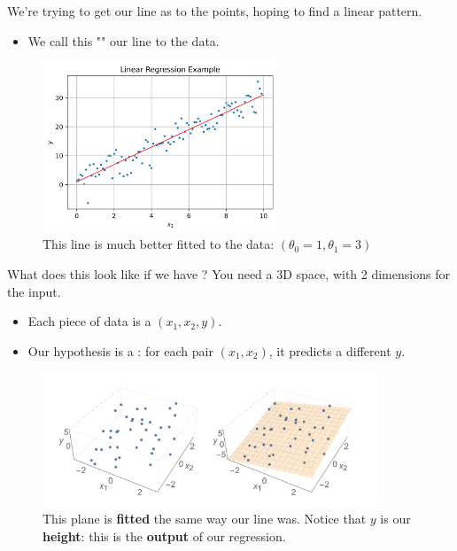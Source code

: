         
        We're trying to get our line as  to the points, hoping to find a linear pattern. 
        
        \begin{itemize}
            \item We call this "" our line to the data.
        \end{itemize}
        
        \begin{figure}[H]
        \centering
            \includegraphics[width=70mm,scale=0.5]{images/regression_images/Regression_Example_Good_Fit.png}
        
            \caption*{This line is much better fitted to the data: $(\theta_0=1, \theta_1=3)$}
        \end{figure}
        
        What does this look like if we have ? You need a 3D space, with 2 dimensions for the input.

        \begin{itemize}
            \item Each piece of data is a  $(x_1,x_2, y)$.
            \item Our hypothesis is a : for each pair $(x_1,x_2)$, it predicts a different $y$.
        \end{itemize}
        
        \begin{figure}[H]
        \centering
            \includegraphics[width=100mm,scale=0.5]{images/regression_images/Regression_Plane.png}
        
            \caption*{This plane is \textbf{fitted} the same way our line was. Notice that $y$ is our \textbf{height}: this is the \textbf{output} of our regression.}
        \end{figure}
        
